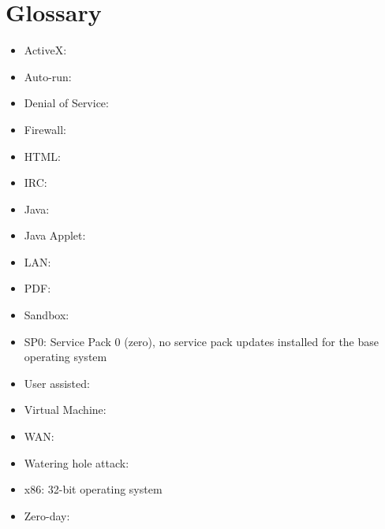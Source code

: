 \newpage
\section{Glossary}

\begin{itemize}
\item ActiveX:
\item Auto-run:
\item Denial of Service:
\item Firewall:
\item HTML:
\item IRC:
\item Java:
\item Java Applet:
\item LAN:
\item PDF:
\item Sandbox:
\item SP0: Service Pack 0 (zero), no service pack updates installed for the base operating system
\item User assisted: 
\item Virtual Machine:
\item WAN:
\item Watering hole attack:
\item x86: 32-bit operating system
\item Zero-day:
\end{itemize}
